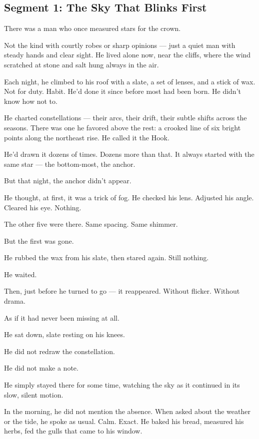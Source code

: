 \documentclass[9pt]{article}
\begin{document}
\newpage

\subsection*{Segment 1: The Sky That Blinks First}

There was a man who once measured stars for the crown.

Not the kind with courtly robes or sharp opinions — just a quiet man with steady hands and clear sight. He lived alone now, near the cliffs, where the wind scratched at stone and salt hung always in the air.

Each night, he climbed to his roof with a slate, a set of lenses, and a stick of wax. Not for duty. Habit. He’d done it since before most had been born. He didn’t know how not to.

He charted constellations — their arcs, their drift, their subtle shifts across the seasons. There was one he favored above the rest: a crooked line of six bright points along the northeast rise. He called it the Hook.

He’d drawn it dozens of times. Dozens more than that. It always started with the same star — the bottom-most, the anchor.

But that night, the anchor didn’t appear.

He thought, at first, it was a trick of fog. He checked his lens. Adjusted his angle. Cleared his eye. Nothing.

The other five were there. Same spacing. Same shimmer.

But the first was gone.

He rubbed the wax from his slate, then stared again. Still nothing.

He waited.

Then, just before he turned to go — it reappeared. Without flicker. Without drama.

As if it had never been missing at all.

He sat down, slate resting on his knees.

He did not redraw the constellation.

He did not make a note.

He simply stayed there for some time, watching the sky as it continued in its slow, silent motion.

In the morning, he did not mention the absence. When asked about the weather or the tide, he spoke as usual. Calm. Exact. He baked his bread, measured his herbs, fed the gulls that came to his window.
\end{document}
